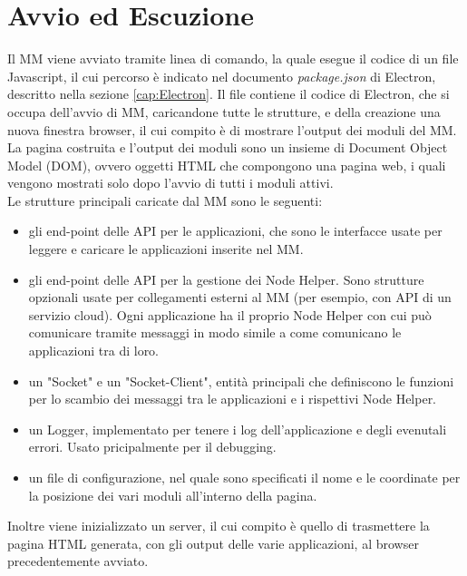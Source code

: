 \section{Avvio ed Escuzione}\label{cap:MMavvio}
Il MM viene avviato tramite linea di comando, la quale esegue
il codice di un file Javascript, il cui percorso \`e indicato nel documento \textit{package.json} di Electron, descritto nella sezione \ref{cap:Electron}.
Il file contiene il codice di Electron, che si occupa dell'avvio di MM, caricandone tutte le strutture, e della creazione una nuova finestra browser,
il cui compito \`e di mostrare l'output dei moduli del MM.
La pagina costruita e l'output dei moduli sono un insieme di Document Object Model (DOM), ovvero oggetti HTML che compongono una pagina web,
i quali vengono mostrati
solo dopo l'avvio di tutti i moduli attivi.\\
Le strutture principali caricate dal MM sono le seguenti:
\begin{itemize}
\item gli end-point delle API per le applicazioni, che sono le interfacce usate per leggere e caricare le applicazioni inserite nel MM.
\item gli end-point delle API per la gestione dei Node Helper. Sono strutture opzionali usate per collegamenti
esterni al MM (per esempio, con API di un servizio cloud). Ogni applicazione ha il proprio Node Helper con cui pu\`o comunicare tramite messaggi in modo
simile a come comunicano le applicazioni tra di loro.
\item un "Socket" e un "Socket-Client", entit\`a principali che definiscono le funzioni per lo scambio dei messaggi tra le applicazioni e i
rispettivi Node Helper.
\item un Logger, implementato per tenere i log dell'applicazione e degli evenutali errori. Usato pricipalmente per il debugging.
\item un file di configurazione, nel quale sono specificati il nome e le coordinate per la posizione dei vari moduli
all'interno della pagina.\\[2\baselineskip]
\end{itemize}
Inoltre viene inizializzato un server, il cui compito \`e quello di trasmettere la pagina HTML generata, con gli output delle varie applicazioni,
al browser precedentemente avviato.

